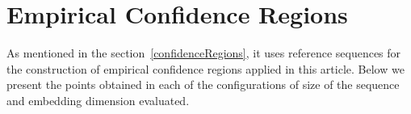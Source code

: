 \appendix
\section{Empirical Confidence Regions}

As mentioned in the section~\ref{confidenceRegions}, it uses reference sequences for the construction of empirical confidence regions applied in this article. 
Below we present the points obtained in each of the configurations of size of the sequence and embedding dimension evaluated.

\begin{comment} 
\begin{table}
	\centering
	\caption{Results found it for samples of true random numbers}
	\label{tab:result1}
	\begin{tabular}{c*{3}rrr}
		\toprule
		Algorithm & \multicolumn{1}{c}{$N$} & \multicolumn{1}{c}{$D$} & \multicolumn{1}{c}{\SI{95}{\percent}} & \multicolumn{1}{c}{\SI{99}{\percent}} & $p$-value\\
		\cmidrule(lr){1-1}
		\cmidrule(lr){2-2}
		\cmidrule(lr){3-3}
		\cmidrule(lr){4-4}
		\cmidrule(lr){5-5}
		\cmidrule(lr){6-6}
		True-Random & 50000 & 3 & $0.97$ & $0.96$ & $0.47856$\\
		& & 4 & $0.94$ & $0.95$ & $0.47555$\\ 
		& & 5 & $0.97$ & $0.96$ & $0.48512$\\ 
		& & 6 & $0.98$ & $0.99$ & $0.48058$\\
		\bottomrule
	\end{tabular}
\end{table}
\end{comment} 

